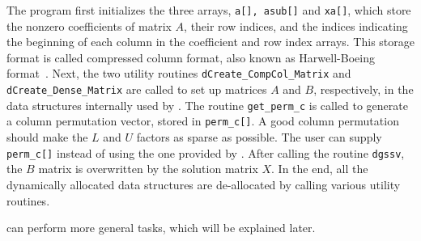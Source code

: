 The program first initializes the three arrays,
{\tt a[], asub[]} and {\tt xa[]}, which store the nonzero coefficients of
matrix $A$, their row indices, and the indices indicating the beginning of
each column in the coefficient and row index arrays.
This storage format is called compressed column format, also known as
Harwell-Boeing format~\cite{duffgrimes92}.
Next, the two utility routines
{\tt dCreate\_CompCol\_Matrix} and {\tt dCreate\_Dense\_Matrix}
are called to set up matrices $A$ and $B$, respectively, 
 in the data structures internally
used by {\SuperLU}. The routine {\tt get\_perm\_c} is called 
to generate a column permutation vector, stored in {\tt perm\_c[]}. A good
column permutation should make the $L$ and $U$ factors as sparse
as possible. The user can supply {\tt perm\_c[]} instead of using
the one provided by {\SuperLU}. After calling the {\SuperLU} routine
{\tt dgssv}, the $B$ matrix is overwritten by the solution matrix $X$.
In the end, all the dynamically allocated data structures are de-allocated
by calling various utility routines.%

{\SuperLU} can perform more general tasks, which will be
explained later.


